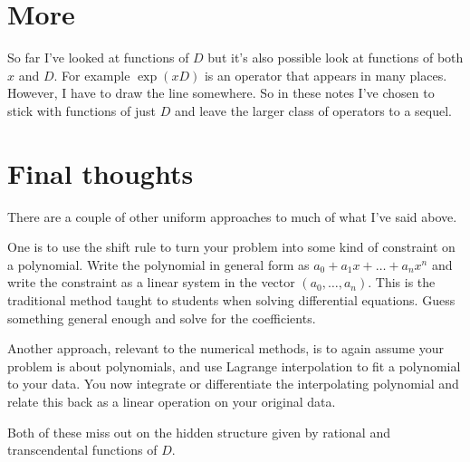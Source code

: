 \documentclass[a4paper]{article}
\theoremstyle{definition}
\begin{document}
\section{More}
So far I've looked at functions of $D$ but it's also possible look at functions of both $x$ and $D$.
For example $\exp(xD)$ is an operator that appears in many places.
However, I have to draw the line somewhere.
So in these notes I've chosen to stick with functions of just $D$ and leave the larger class of operators to a sequel.

\section{Final thoughts}
There are a couple of other uniform approaches to much of what I've said above.

One is to use the shift rule to turn your problem into some kind of constraint on a polynomial.
Write the polynomial in general form as $a_0+a_1x+\ldots+a_nx^n$ and write the constraint as a linear system in the vector $(a_0,\ldots,a_n)$.
This is the traditional method taught to students when solving differential equations.
Guess something general enough and solve for the coefficients.

Another approach, relevant to the numerical methods, is to again assume your problem is about polynomials, and use Lagrange interpolation to fit a polynomial to your data.
You now integrate or differentiate the interpolating polynomial and relate this back as a linear operation on your original data.

Both of these miss out on the hidden structure given by rational and transcendental functions of $D$.



\end{document}
